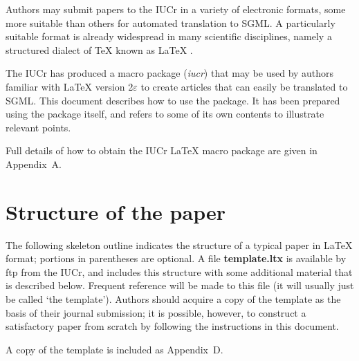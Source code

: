 \documentclass{iucr}              %
\begin{document}
Authors may submit papers to the IUCr in a variety of electronic formats, some
more suitable than others for automated translation to SGML. A particularly
suitable format is already widespread in many scientific disciplines, namely
a structured dialect of \TeX{} known as \LaTeX{} \cite{lamport86}.

The IUCr has produced a macro package (\emph{iucr}) that may be used by
authors familiar with \LaTeX{} version 2$\varepsilon$ to create articles
that can easily be translated to SGML. This document describes how to use
the package. It has been prepared using the package itself, and refers to some
of its own contents to illustrate relevant points.

Full details of how to obtain the IUCr \LaTeX{} macro package are given in
Appendix~A.

\section{Structure of the paper}

The following skeleton outline indicates the structure of a typical paper in
\LaTeX{} format; portions in parentheses are optional. A file
\textbf{template.ltx} is available by ftp from the IUCr, and includes this
structure with some additional material that is described below. Frequent
reference will be made to this file (it will usually just be called `the
template'). Authors should acquire a copy of the template as the basis of
their journal submission; it is possible, however, to construct a
satisfactory paper from scratch by following the instructions in
this document.

A copy of the template is included as Appendix~D.
\end{document}

